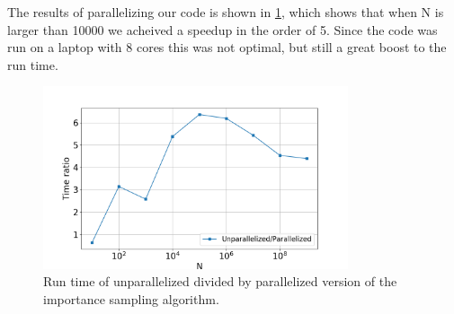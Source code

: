 The results of parallelizing our code is shown in \cref{fig:mc_time_ratio}, which
shows that when N is larger than 10000 we acheived a speedup in the order of 5.
Since the code was run on a laptop with 8 cores this was not optimal, but still
a great boost to the run time.

\begin{figure}[H]
  \centering
  \includegraphics[width=0.8\textwidth]{../figures/mc_time_ratio.png}
  \caption{Run time of unparallelized divided by parallelized version
          of the importance sampling algorithm.}

  \label{fig:mc_time_ratio}
\end{figure}
